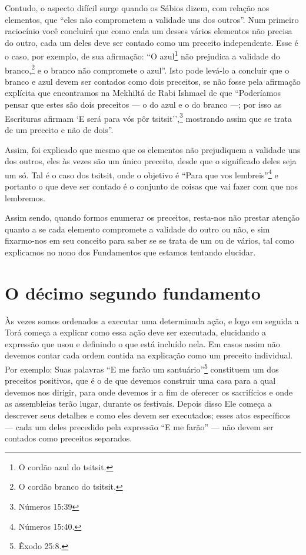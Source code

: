 Contudo, o aspecto difícil surge quando os Sábios dizem, com relação
aos elementos, que ``eles não comprometem a validade uns dos outros''.
Num primeiro raciocínio você concluirá que como cada um desses vários
elementos não precisa do outro, cada um deles deve ser contado como um
preceito independente. Esse é o caso, por exemplo, de sua afirmação:
``O azul\footnote{O cordão azul do tsitsit.} não prejudica a validade do
branco,\footnote{O cordão branco do tsitsit.} e o branco não compromete o azul''. Isto
pode levá-lo a concluir que o branco e azul devem ser contados como dois
preceitos, se não fosse pela afirmação explícita que encontramos na
Mekhiltá de Rabi Ishmael de que ``Poderíamos pensar que estes são dois
preceitos --- o do azul e o do branco ---; por isso as Escrituras
afirmam `E será para vós pôr tsitsit'',\footnote{Números 15:39} mostrando
assim que se trata de um preceito e não de dois''.

Assim, foi explicado que mesmo que os elementos não prejudiquem a
validade uns dos outros, eles às vezes são um único preceito, desde que
o significado deles seja um só. Tal é o caso dos tsitsit, onde o
objetivo é ``Para que vos lembreis''\footnote{Números 15:40.} e portanto o que
deve ser contado é o conjunto de coisas que vai fazer com que nos
lembremos.

Assim sendo, quando formos enumerar os preceitos, resta-nos não prestar
atenção quanto a se cada elemento compromete a validade do outro ou não,
e sim fixarmo-nos em seu conceito para saber se se trata de um ou de
vários, tal como explicamos no nono dos Fundamentos que estamos tentando
elucidar.



\chapter*{O décimo segundo fundamento}

Às vezes somos ordenados a executar uma determinada ação, e logo em
seguida a Torá começa a explicar como essa ação deve ser executada,
elucidando a expressão que usou e definindo o que está incluído nela. Em
casos assim não devemos contar cada ordem contida na explicação como um
preceito individual. Por exemplo: Suas palavras ``E me farão um
santuário''\footnote{Êxodo 25:8.} constituem um dos preceitos positivos, que é o
de que devemos construir uma casa para a qual devemos nos dirigir, para
onde devemos ir a fim de oferecer os sacrifícios e onde as assembleias
terão lugar, durante os festivais. Depois disso Ele começa a descrever
seus detalhes e como eles devem ser executados; esses atos específicos
--- cada um deles precedido pela expressão ``E me farão'' --- não devem
ser contados como preceitos separados.

